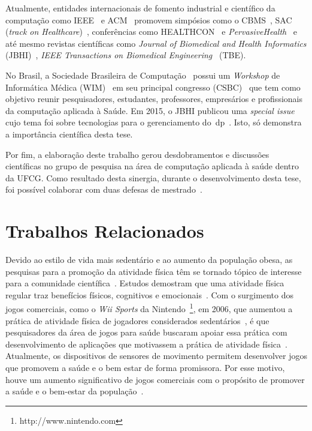 
Atualmente, entidades internacionais de fomento industrial e científico da computação como IEEE~\cite{ieee2016} e ACM~\cite{acm2016} promovem simpósios como o CBMS~\cite{cbms2016}, SAC (\textit{track on Healthcare})~\cite{sachealth2016}, conferências como HEALTHCON~\cite{healthcon2016} e \textit{PervasiveHealth}~\cite{pervasivehealth2016} e até mesmo revistas científicas como \textit{Journal of Biomedical and Health Informatics} (JBHI)~\cite{jbhi2016}, \textit{IEEE Transactions on Biomedical Engineering}~\cite{tbe2016} (TBE). 

No Brasil, a Sociedade Brasileira de Computação~\cite{sbc2016} possui um \textit{Workshop} de Informática Médica (WIM)~\cite{wim2016} em seu principal congresso (CSBC)~\cite{csbc2016} que tem como objetivo reunir pesquisadores, estudantes, professores, empresários e profissionais da computação aplicada à Saúde. Em 2015, o JBHI publicou uma \textit{special issue} cujo tema foi sobre tecnologias para o gerenciamento do~\ac{dp}~\cite{specjbhi2015}. Isto, só demonstra a importância científica desta tese. %

Por fim, a elaboração deste trabalho gerou desdobramentos e discussões científicas no grupo de pesquisa na área de computação aplicada à saúde dentro da UFCG. Como resultado desta sinergia, durante o desenvolvimento desta tese, foi possível colaborar com duas defesas de mestrado~\cite{antonio2013,gustavo2014}. 


\section{Trabalhos Relacionados}\label{section:trabalhos_relacionados}

Devido ao estilo de vida mais sedentário e ao aumento da população obesa, as pesquisas para a promoção da atividade física têm se tornado tópico de interesse para a comunidade científica~\cite{bartolome11,Mandryk2014}. Estudos demostram que uma atividade física regular traz benefícios físicos, cognitivos e emocionais~\cite{Mandryk2014}. Com o surgimento dos jogos comerciais, como o \textit{Wii Sports} da Nintendo~\footnote{http://www.nintendo.com}, em 2006, que aumentou a prática de atividade física de jogadores considerados sedentários~\cite{wiigraves2008}, é que pesquisadores da área de jogos para saúde buscaram apoiar essa prática com desenvolvimento de aplicações que motivassem a prática de atividade física~\cite{seriousgameolder2015}. Atualmente, os dispositivos de sensores de movimento permitem desenvolver jogos que promovem a saúde e o bem estar de forma promissora. Por esse motivo, houve um aumento significativo de jogos comerciais com o propósito de promover a saúde e o bem-estar da população~\cite{wiiassesspark2016}.


